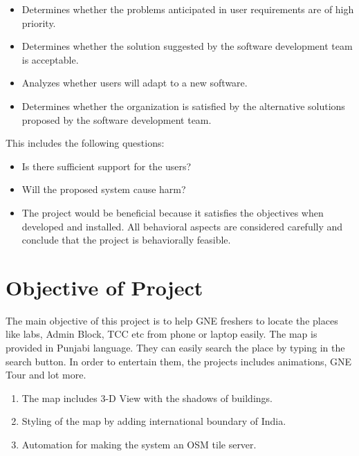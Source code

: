 \begin{itemize}
	\item Determines whether the problems anticipated in user requirements are of high priority.
	\item Determines whether the solution suggested by the software development team is acceptable.
	\item Analyzes whether users will adapt to a new software.
	\item Determines whether the organization is satisfied by the alternative solutions proposed by the software development team.
\end{itemize}

This includes the following questions:
\begin{itemize}
	\item Is there sufficient support for the users?
	\item Will the proposed system cause harm?
	\item The project would be beneficial because it satisfies the objectives when developed and installed. All behavioral aspects are considered carefully and conclude that the project is behaviorally feasible.
\end{itemize}

\section{Objective of Project }
The main objective of this project is to help GNE freshers to locate the places like labs, Admin Block, TCC etc from phone or laptop easily. The map is provided in Punjabi language. They can easily search the place by typing in the search button. In order to entertain them, the projects includes animations, GNE Tour and lot more. 
\begin{enumerate}
\item The map includes 3-D View with the shadows of buildings.
\item Styling of the map by adding international boundary of India.
\item Automation for making the system an OSM tile server.
\end{enumerate}

